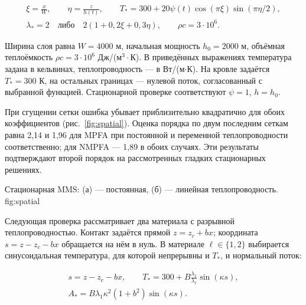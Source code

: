 \begin{gather}
 \xi=\frac{x}{W},\qquad \eta=\frac{z}{h(t)},\qquad
 T_*=300+20\psi(t)\cos(\pi\xi)\sin(\pi\eta/2),\\
 \lambda_*=2\quad\text{либо}\quad2(1+0{,}2\xi+0{,}3\eta),\qquad
 \rho c=3\cdot10^6.
\end{gather}

Ширина слоя равна $W=4000$ м, начальная мощность $h_0=2000$ м,
объёмная теплоёмкость $\rho c=3\cdot10^6$ Дж/(м$^3\cdot$К).
В приведённых выражениях температура задана в кельвинах,
теплопроводность --- в Вт/(м$\cdot$К).
На кровле задаётся $T_*=300$ К, на остальных границах ---
нулевой поток, согласованный с выбранной функцией.
Стационарной проверке соответствуют $\psi=1$, $h=h_0$.

При сгущении сетки ошибка убывает приблизительно квадратично
для обоих коэффициентов (рис.~\ref{fig:spatial}).
Оценка порядка по двум последним сеткам равна 2,14 и 1,96
для MPFA при постоянной и переменной теплопроводности соответственно;
для NMPFA --- 1,89 в обоих случаях. Эти результаты подтверждают
второй порядок на рассмотренных гладких стационарных решениях.

  {Стационарная MMS: (а) --- постоянная, (б) --- линейная теплопроводность.}
  {fig:spatial}


Следующая проверка рассматривает два материала с разрывной
теплопроводностью. Контакт задаётся прямой $z=z_c+bx$;
координата $s=z-z_c-bx$ обращается на нём в нуль.
В материале $\ell\in\{1,2\}$ выбирается синусоидальная температура,
для которой непрерывны и $T_*$, и нормальный поток:

\begin{gather}
 s=z-z_c-bx,\qquad
 T_*=300+B\frac{\lambda_1}{\lambda_\ell}\sin(\kappa s),\\
 A_*=B\lambda_1\kappa^2(1+b^2)\sin(\kappa s).
\end{gather}

